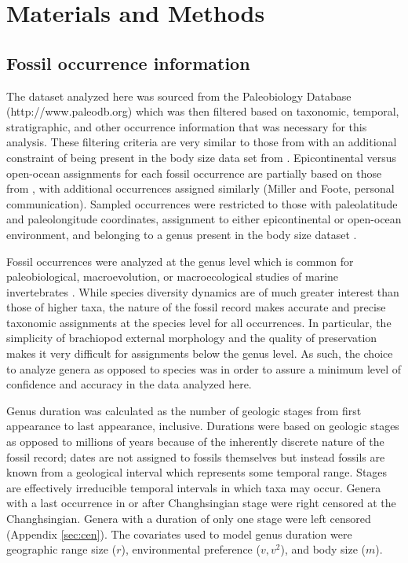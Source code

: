 \documentclass[12pt,letterpaper]{article}
\begin{document}
\section{Materials and Methods}

\subsection{Fossil occurrence information}

The dataset analyzed here was sourced from the Paleobiology Database (http://www.paleodb.org) which was then filtered based on taxonomic, temporal, stratigraphic, and other occurrence information that was necessary for this analysis. These filtering criteria are very similar to those from \citet{Foote2013} with an additional constraint of being present in the body size data set from \citet{Payne2014}. Epicontinental versus open-ocean assignments for each fossil occurrence are partially based on those from \citet{Miller2009a}, with additional occurrences assigned similarly (Miller and Foote, personal communication). Sampled occurrences were restricted to those with paleolatitude and paleolongitude coordinates, assignment to either epicontinental or open-ocean environment, and belonging to a genus present in the body size dataset \citep{Payne2014}. 

Fossil occurrences were analyzed at the genus level which is common for paleobiological, macroevolution, or macroecological studies of marine invertebrates \citep{Alroy2010,Foote2013,Harnik2013,Kiessling2007a,Miller2009a,Nurnberg2013a,Nurnberg2015,Payne2007,Simpson2009,Vilhena2013}. While species diversity dynamics are of much greater interest than those of higher taxa, the nature of the fossil record makes accurate and precise taxonomic assignments at the species level for all occurrences. In particular, the simplicity of brachiopod external morphology and the quality of preservation makes it very difficult for assignments below the genus level. As such, the choice to analyze genera as opposed to species was in order to assure a minimum level of confidence and accuracy in the data analyzed here.

Genus duration was calculated as the number of geologic stages from first appearance to last appearance, inclusive. Durations were based on geologic stages as opposed to millions of years because of the inherently discrete nature of the fossil record; dates are not assigned to fossils themselves but instead fossils are known from a geological interval which represents some temporal range. Stages are effectively irreducible temporal intervals in which taxa may occur. Genera with a last occurrence in or after Changhsingian stage were right censored at the Changhsingian. Genera with a duration of only one stage were left censored (Appendix \ref{sec:cen}). The covariates used to model genus duration were geographic range size (\(r\)), environmental preference (\(v, v^{2}\)), and body size (\(m\)). 
\end{document}
